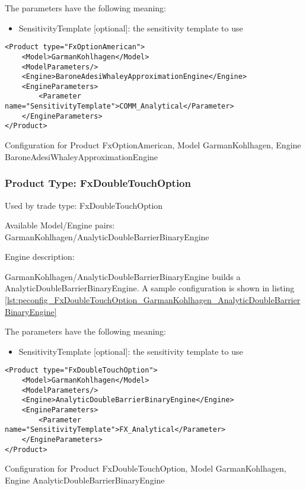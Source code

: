 The parameters have the following meaning:

\begin{itemize}
\item SensitivityTemplate [optional]: the sensitivity template to use 
\end{itemize}

\begin{longlisting}
\begin{verbatim}
<Product type="FxOptionAmerican">
    <Model>GarmanKohlhagen</Model>
    <ModelParameters/>
    <Engine>BaroneAdesiWhaleyApproximationEngine</Engine>
    <EngineParameters>
        <Parameter name="SensitivityTemplate">COMM_Analytical</Parameter>
    </EngineParameters>
</Product>
\end{verbatim}
\caption{Configuration for Product FxOptionAmerican, Model GarmanKohlhagen, Engine BaroneAdesiWhaleyApproximationEngine}
\label{lst:peconfig_FxOptionAmerican_GarmanKohlhagen_BaroneAdesiWhaleyApproximationEngine}
\end{longlisting}

\subsubsection{Product Type: FxDoubleTouchOption}

Used by trade type: FxDoubleTouchOption

Available Model/Engine pairs: GarmanKohlhagen/AnalyticDoubleBarrierBinaryEngine

Engine description:

GarmanKohlhagen/AnalyticDoubleBarrierBinaryEngine builds a AnalyticDoubleBarrierBinaryEngine. A sample configuration is
shown in listing \ref{lst:peconfig_FxDoubleTouchOption_GarmanKohlhagen_AnalyticDoubleBarrierBinaryEngine}

The parameters have the following meaning:

\begin{itemize}
\item SensitivityTemplate [optional]: the sensitivity template to use 
\end{itemize}

\begin{longlisting}
\begin{verbatim}
<Product type="FxDoubleTouchOption">
    <Model>GarmanKohlhagen</Model>
    <ModelParameters/>
    <Engine>AnalyticDoubleBarrierBinaryEngine</Engine>
    <EngineParameters>
        <Parameter name="SensitivityTemplate">FX_Analytical</Parameter>
    </EngineParameters>
</Product>
\end{verbatim}
\caption{Configuration for Product FxDoubleTouchOption, Model GarmanKohlhagen, Engine AnalyticDoubleBarrierBinaryEngine}
\label{lst:peconfig_FxDoubleTouchOption_GarmanKohlhagen_AnalyticDoubleBarrierBinaryEngine}
\end{longlisting}

